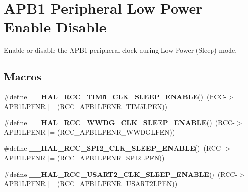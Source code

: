 \hypertarget{group___r_c_c___a_p_b1___low_power___enable___disable}{}\section{A\+P\+B1 Peripheral Low Power Enable Disable}
\label{group___r_c_c___a_p_b1___low_power___enable___disable}


Enable or disable the A\+P\+B1 peripheral clock during Low Power (Sleep) mode.  


\subsection*{Macros}
\begin{DoxyCompactItemize}
\item 
\#define {\bfseries \+\_\+\+\_\+\+H\+A\+L\+\_\+\+R\+C\+C\+\_\+\+T\+I\+M5\+\_\+\+C\+L\+K\+\_\+\+S\+L\+E\+E\+P\+\_\+\+E\+N\+A\+B\+LE}()~(R\+CC-\/$>$A\+P\+B1\+L\+P\+E\+NR $\vert$= (R\+C\+C\+\_\+\+A\+P\+B1\+L\+P\+E\+N\+R\+\_\+\+T\+I\+M5\+L\+P\+EN))\hypertarget{group___r_c_c___a_p_b1___low_power___enable___disable_gae99e46f9e40655dc9b5c07b03fdc4a4e}{}\label{group___r_c_c___a_p_b1___low_power___enable___disable_gae99e46f9e40655dc9b5c07b03fdc4a4e}

\item 
\#define {\bfseries \+\_\+\+\_\+\+H\+A\+L\+\_\+\+R\+C\+C\+\_\+\+W\+W\+D\+G\+\_\+\+C\+L\+K\+\_\+\+S\+L\+E\+E\+P\+\_\+\+E\+N\+A\+B\+LE}()~(R\+CC-\/$>$A\+P\+B1\+L\+P\+E\+NR $\vert$= (R\+C\+C\+\_\+\+A\+P\+B1\+L\+P\+E\+N\+R\+\_\+\+W\+W\+D\+G\+L\+P\+EN))\hypertarget{group___r_c_c___a_p_b1___low_power___enable___disable_gaa3978a2e193b921dc24976880dce7a26}{}\label{group___r_c_c___a_p_b1___low_power___enable___disable_gaa3978a2e193b921dc24976880dce7a26}

\item 
\#define {\bfseries \+\_\+\+\_\+\+H\+A\+L\+\_\+\+R\+C\+C\+\_\+\+S\+P\+I2\+\_\+\+C\+L\+K\+\_\+\+S\+L\+E\+E\+P\+\_\+\+E\+N\+A\+B\+LE}()~(R\+CC-\/$>$A\+P\+B1\+L\+P\+E\+NR $\vert$= (R\+C\+C\+\_\+\+A\+P\+B1\+L\+P\+E\+N\+R\+\_\+\+S\+P\+I2\+L\+P\+EN))\hypertarget{group___r_c_c___a_p_b1___low_power___enable___disable_ga8a281ca72aff1c9fa87755c3854cc316}{}\label{group___r_c_c___a_p_b1___low_power___enable___disable_ga8a281ca72aff1c9fa87755c3854cc316}

\item 
\#define {\bfseries \+\_\+\+\_\+\+H\+A\+L\+\_\+\+R\+C\+C\+\_\+\+U\+S\+A\+R\+T2\+\_\+\+C\+L\+K\+\_\+\+S\+L\+E\+E\+P\+\_\+\+E\+N\+A\+B\+LE}()~(R\+CC-\/$>$A\+P\+B1\+L\+P\+E\+NR $\vert$= (R\+C\+C\+\_\+\+A\+P\+B1\+L\+P\+E\+N\+R\+\_\+\+U\+S\+A\+R\+T2\+L\+P\+EN))\hypertarget{group___r_c_c___a_p_b1___low_power___enable___disable_ga12132da4a7f5c62f32cd9d91b1c99495}{}\label{group___r_c_c___a_p_b1___low_power___enable___disable_ga12132da4a7f5c62f32cd9d91b1c99495}


\end{DoxyCompactItemize}
